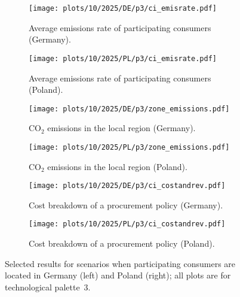 \documentclass[11pt, 5p, nopreprintline]{elsarticle}
\begin{document}
\begin{figure*}
    \centering
    \begin{subfigure}{0.5\textwidth}
        \centering
        \caption{Average emissions rate of participating consumers (Germany).}
        \texttt{[image: plots/10/2025/DE/p3/ci\_emisrate.pdf]}
        \label{fig:10-2025-DE-p3-ci_emisrate}
    \end{subfigure}%
    \begin{subfigure}{0.5\textwidth}
        \centering
        \caption{Average emissions rate of participating consumers (Poland).}
        \texttt{[image: plots/10/2025/PL/p3/ci\_emisrate.pdf]}
        \label{fig:10-2025-PL-p3-ci_emisrate}
    \end{subfigure}

    \begin{subfigure}{0.5\textwidth}
        \centering
        \caption{CO$_2$ emissions in the local region (Germany).}
        \texttt{[image: plots/10/2025/DE/p3/zone\_emissions.pdf]}
        \label{fig:10-2025-DE-p3-zone_emissions}
    \end{subfigure}%
    \begin{subfigure}{0.5\textwidth}
        \centering
        \caption{CO$_2$ emissions in the local region (Poland).}
        \texttt{[image: plots/10/2025/PL/p3/zone\_emissions.pdf]}
        \label{fig:10-2025-PL-p3-zone_emissions}
    \end{subfigure}%

    \begin{subfigure}{0.5\textwidth}
        \centering
        \caption{Cost breakdown of a procurement policy (Germany).}
        \texttt{[image: plots/10/2025/DE/p3/ci\_costandrev.pdf]}
        \label{fig:10-2025-DE-p3-ci_costandrev}
    \end{subfigure}%
    \begin{subfigure}{0.5\textwidth}
        \centering
        \caption{Cost breakdown of a procurement policy (Poland).}
        \texttt{[image: plots/10/2025/PL/p3/ci\_costandrev.pdf]}
        \label{fig:10-2025-PL-p3-ci_costandrev}
    \end{subfigure}
    \caption{Selected results for scenarios when participating consumers are located in Germany (left) and Poland (right); all plots are for technological palette~3.}
    \label{fig:10-2025-DEPL-p3-4plots}
\end{figure*}
\end{document}
